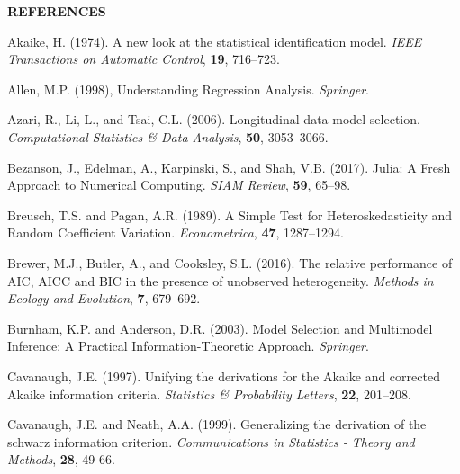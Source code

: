 
\begin{center}
\textbf{REFERENCES}
\end{center}
\singlespace

\phantom{a}

\rff Akaike, H. (1974).
      A new look at the statistical identification model.
     {\it IEEE Transactions on Automatic Control},
     {\bf 19}, {716--723}.

\phantom{a}

\rff Allen, M.P. (1998),
      Understanding Regression Analysis.
      {\it Springer}.

\phantom{a}

\rff Azari, R., Li, L., and Tsai, C.L. (2006).
      Longitudinal data model selection.
      {\it Computational Statistics \& Data Analysis},
      {\bf 50}, {3053--3066}.

\phantom{a}

\rff Bezanson, J., Edelman, A., Karpinski, S., and Shah, V.B. (2017).
      Julia: A Fresh Approach to Numerical Computing.
      {\it SIAM Review},
      {\bf 59}, {65--98}.

\phantom{a}

\rff Breusch, T.S. and Pagan, A.R. (1989).
      A Simple Test for Heteroskedasticity and Random Coefficient Variation.
      {\it Econometrica},
      {\bf 47}, {1287--1294}.

\phantom{a}

\rff Brewer, M.J., Butler, A., and Cooksley, S.L. (2016).
      The relative performance of AIC, AICC and BIC in the presence of unobserved heterogeneity.
      {\it Methods in Ecology and Evolution},
      {\bf 7}, {679--692}.

\phantom{a}

\rff Burnham, K.P. and Anderson, D.R. (2003).
      Model Selection and Multimodel Inference: A Practical Information-Theoretic Approach.
      {\it Springer}.

\phantom{a}

\rff Cavanaugh, J.E. (1997).
      Unifying the derivations for the Akaike and corrected Akaike information criteria.
      {\it Statistics \& Probability Letters},
      {\bf 22}, {201--208}.

\phantom{a}

\rff Cavanaugh, J.E. and Neath, A.A. (1999).
      Generalizing the derivation of the schwarz information criterion.
      {\it Communications in Statistics - Theory and Methods},
      {\bf 28}, {49-66}.

